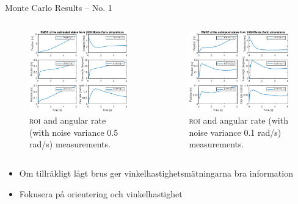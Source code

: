 \documentclass{beamer}
\newcommand{\roi}{\textsc{roi}\xspace}
\renewcommand{\a}{\r{a}\xspace}
\renewcommand{\aa}{\"a\xspace}
\begin{document}
\begin{frame}{Monte Carlo Results -- No. 1}
	\begin{columns}[T]
	\begin{figure}
		\includegraphics[width=\textwidth]{MC/21_MC_1000_Rmse}
		\caption{\roi and angular rate (with noise variance 0.5 rad/s) measurements.}
	\end{figure}
	\begin{figure}
		\includegraphics[width=\textwidth]{MC/20_MC_1000_Rmse}
		\caption{\roi and angular rate (with noise variance 0.1 rad/s) measurements.}
	\end{figure}
	\end{columns}

	\note
	{
		\begin{itemize}
			\item Om tillr\aa{}kligt l\a{}gt brus ger vinkelhastighetsm\aa{}tningarna bra information
			\item Fokusera p\a{} orientering och vinkelhastighet
		\end{itemize}
	}
\end{frame}
\end{document}
